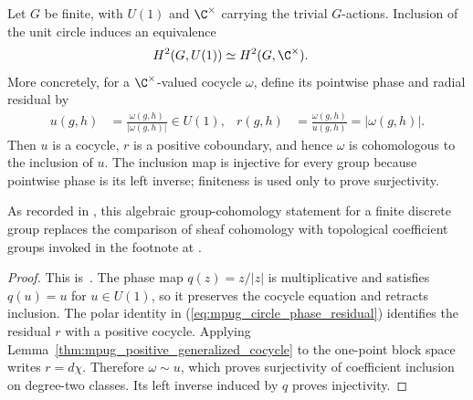 \begin{lemma}
    \label{thm:mpug_circle_complex_units_h2}
    \leanok
    Let $G$ be finite, with $U(1)$ and $\C^\times$ carrying the trivial
    $G$-actions.  Inclusion of the unit circle induces an equivalence
    \begin{align}
        H^2(G,U(1))
         & \simeq H^2(G,\C^\times).
        \label{eq:mpug_circle_complex_units_h2}
    \end{align}
    More concretely, for a $\C^\times$-valued cocycle $\omega$, define its
    pointwise phase and radial residual by
    \begin{align}
        u(g,h)
         & =\frac{\omega(g,h)}{|\omega(g,h)|}\in U(1),
         &
        r(g,h)
         & =\frac{\omega(g,h)}{u(g,h)}=|\omega(g,h)|.
        \label{eq:mpug_circle_phase_residual}
    \end{align}
    Then $u$ is a cocycle, $r$ is a positive coboundary, and hence $\omega$
    is cohomologous to the inclusion of $u$.  The inclusion map is injective
    for every group because pointwise phase is its left inverse; finiteness is
    used only to prove surjectivity.

    As recorded in \cite{gap:fbc25_circle_complex_units_cohomology}, this
    algebraic group-cohomology statement for a finite discrete group replaces
    the comparison of sheaf cohomology with topological coefficient groups
    invoked in the footnote at
    \cite[line~1931]{FrancoRubio2025MPUGauging}.
\end{lemma}

\begin{proof}\leanok
    This is~\cite[``Circle and nonzero-complex coefficients in degree
        two'']{QICLean2026Blueprint}.
    The phase map $q(z)=z/|z|$ is multiplicative and satisfies
    $q(u)=u$ for $u\in U(1)$, so it preserves the cocycle equation and
    retracts inclusion.  The polar identity in
    (\ref{eq:mpug_circle_phase_residual}) identifies the residual $r$ with a
    positive cocycle.  Applying
    Lemma~\ref{thm:mpug_positive_generalized_cocycle} to the one-point block
    space writes $r=d\chi$.  Therefore $\omega\sim u$, which proves
    surjectivity of coefficient inclusion on degree-two classes.  Its left
    inverse induced by $q$ proves injectivity.
\end{proof}

